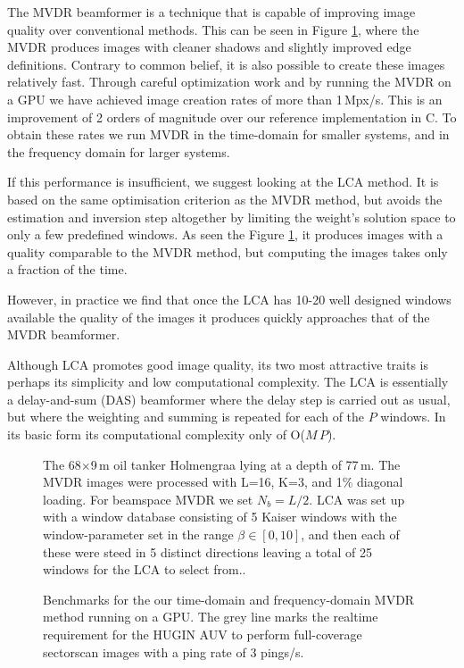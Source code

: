 The MVDR beamformer is a technique that is capable of improving image quality over conventional methods. This can be seen in Figure \ref{2_fig_holmengraa}, where the MVDR produces images with cleaner shadows and slightly improved edge definitions. Contrary to common belief, it is also possible to create these images relatively fast. Through careful optimization work and by running the MVDR on a GPU we have achieved image creation rates of more than 1\,Mpx/s. This is an improvement of 2 orders of magnitude over our reference implementation in C. To obtain these rates we run MVDR in the time-domain for smaller systems, and in the frequency domain for larger systems.

If this performance is insufficient, we suggest looking at the LCA method. It is based on the same optimisation criterion as the MVDR method, but avoids the estimation and inversion step altogether by limiting the weight's solution space to only a few predefined windows. As seen the Figure \ref{2_fig_holmengraa}, it produces images with a quality comparable to the MVDR method, but computing the images takes only a fraction of the time.

However, in practice we find that once the LCA has 10-20 well designed windows available the quality of the images it produces quickly approaches that of the MVDR beamformer.

Although LCA promotes good image quality, its two most attractive traits is perhaps its simplicity and low computational complexity. The LCA is essentially a delay-and-sum (DAS) beamformer where the delay step is carried out as usual, but where the weighting and summing is repeated for each of the $P$ windows. In its basic form its computational complexity only of O($M\,P$).


\begin{figure}[!t]\centering\label{2_fig_holmengraa}%
%
\caption{The 68$\times$9\,m oil tanker Holmengraa lying at a depth of 77\,m. The MVDR images were processed with L=16, K=3, and 1\% diagonal loading. For beamspace MVDR we set $N_b=L/2$. LCA was set up with a window database consisting of 5 Kaiser windows with the window-parameter set in the range $\beta\in[0,10]$, and then each of these were steed in 5 distinct directions leaving a total of 25 windows for the LCA to select from..}
\end{figure}

\begin{figure}[!h]\centering%
%
\caption{Benchmarks for the our time-domain and frequency-domain MVDR method running on a GPU. The grey line marks the realtime requirement for the HUGIN AUV to perform full-coverage sectorscan images with a ping rate of 3 pings/s.}\label{2_fig_benchmark}
\end{figure}

